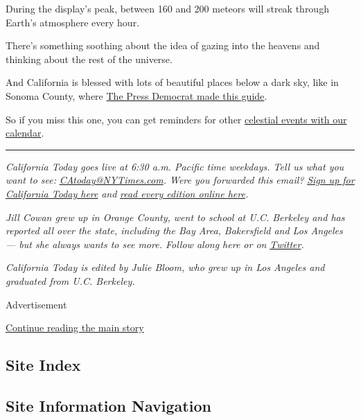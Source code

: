 During the display's peak, between 160 and 200 meteors will streak
through Earth's atmosphere every hour.

There's something soothing about the idea of gazing into the heavens and
thinking about the rest of the universe.

And California is blessed with lots of beautiful places below a dark
sky, like in Sonoma County, where
\href{https://www.pressdemocrat.com/article/news/how-to-watch-the-perseid-meteor-shower-2020/}{The
Press Democrat made this guide}.

So if you miss this one, you can get reminders for other
\href{https://www.nytimes3xbfgragh.onion/interactive/2020/science/2020-astronomy-space-calendar.html}{celestial
events with our calendar}.

\begin{center}\rule{0.5\linewidth}{\linethickness}\end{center}

\emph{California Today goes live at 6:30 a.m. Pacific time weekdays.
Tell us what you want to see:}
\href{mailto:CAtoday@NYTimes.com}{\emph{CAtoday@NYTimes.com}}\emph{.
Were you forwarded this email?}
\href{https://www.nytimes3xbfgragh.onion/newsletters/california-today?module=inline}{\emph{Sign
up for California Today here}} \emph{and}
\href{https://www.nytimes3xbfgragh.onion/column/california-today}{\emph{read
every edition online here}}\emph{.}

\emph{Jill Cowan grew up in Orange County, went to school at U.C.
Berkeley and has reported all over the state, including the Bay Area,
Bakersfield and Los Angeles --- but she always wants to see more. Follow
along here or on}
\href{https://twitter.com/JillCowan}{\emph{Twitter}}\emph{.}

\emph{California Today is edited by Julie Bloom, who grew up in Los
Angeles and graduated from U.C. Berkeley.}

Advertisement

\protect\hyperlink{after-bottom}{Continue reading the main story}

\hypertarget{site-index}{%
\subsection{Site Index}\label{site-index}}

\hypertarget{site-information-navigation}{%
\subsection{Site Information
Navigation}\label{site-information-navigation}}

